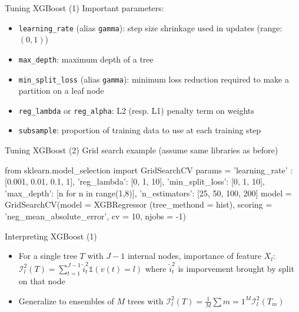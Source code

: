 \documentclass{beamer}
\begin{document}
    \begin{frame}{Tuning XGBoost (1)}
        Important parameters:
        \begin{itemize}
            \item \texttt{learning\_rate} (alias \texttt{gamma}): step size shrinkage used in updates (range: $(0,1)$)
            \item \texttt{max\_depth}: maximum depth of a tree
            \item \texttt{min\_split\_loss} (alias \texttt{gamma}): minimum loss reduction required to make a partition on a leaf node
            \item \texttt{reg\_lambda} or \texttt{reg\_alpha}: L2 (resp. L1) penalty term on weights
            \item \texttt{subsample}: proportion of training data to use at each training step
        \end{itemize}
    \end{frame}

    \begin{frame}[fragile]{Tuning XGBoost (2)}
        Grid search example (assume same libraries as before)
        \begin{python}
        from sklearn.model_selection import GridSearchCV
        params = { 'learning_rate' : [0.001, 0.01, 0.1, 1],
                   'reg_lambda': [0, 1, 10],
                   'min_split_loss': [0, 1, 10],
                   'max_depth': [n for n in range(1,8)],
                   'n_estimators': [25, 50, 100, 200]
        }
        model = GridSearchCV(model = XGBRegressor
                            (tree_methond = hist),
                            scoring = 
                            'neg_mean_absolute_error',
                            cv = 10, njobs = -1)
        \end{python}
    \end{frame}

    \begin{frame}{Interpreting XGBoost (1)}
        \begin{itemize}
            \item For a single tree $T$ with $J-1$ internal nodes, \alert{importance} of feature $X_{l}$: $\mathcal{I}_{l}^2(T) = \sum_{t=1}^{J-1} \hat{i}_t^2 \mathds{1} (v(t) = l)$ where $\hat{i}_t^2$ is imporvement brought by split on that node
            \item Generalize to ensembles of $M$ trees with $\mathcal{I}_{l}^2(T) = \frac{1}{M} \sum{m=1}^M \mathcal{I}_{l}^2(T_m) $
        \end{itemize}
    \end{frame}
\end{document}
